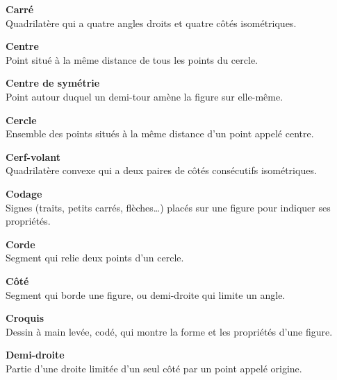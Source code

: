 \begin{tcbraster}[raster columns=2, raster equal height, raster valign=top,raster column skip=2mm, raster row skip=2mm]
\begin{terme}
\end{terme}
\begin{terme}
\textbf{\large Carré}\\[2pt]
{\small Quadrilatère qui a quatre angles droits et quatre côtés isométriques.}
\end{terme}
\begin{terme}
\textbf{\large Centre}\\[2pt]
{\small Point situé à la même distance de tous les points du cercle.}
\end{terme}
\begin{terme}
\textbf{\large Centre de symétrie}\\[2pt]
{\small Point autour duquel un demi-tour amène la figure sur elle-même.}
\end{terme}
\begin{terme}
\textbf{\large Cercle}\\[2pt]
{\small Ensemble des points situés à la même distance d'un point appelé centre.}
\end{terme}
\begin{terme}
\textbf{\large Cerf-volant}\\[2pt]
{\small Quadrilatère convexe qui a deux paires de côtés consécutifs isométriques.}
\end{terme}
\begin{terme}
\textbf{\large Codage}\\[2pt]
{\small Signes (traits, petits carrés, flèches\ldots) placés sur une figure pour indiquer ses propriétés.}
\end{terme}
\begin{terme}
\textbf{\large Corde}\\[2pt]
{\small Segment qui relie deux points d'un cercle.}
\end{terme}
\begin{terme}
\textbf{\large Côté}\\[2pt]
{\small Segment qui borde une figure, ou demi-droite qui limite un angle.}
\end{terme}
\begin{terme}
\textbf{\large Croquis}\\[2pt]
{\small Dessin à main levée, codé, qui montre la forme et les propriétés d'une figure.}
\end{terme}
\begin{terme}
\textbf{\large Demi-droite}\\[2pt]
{\small Partie d'une droite limitée d'un seul côté par un point appelé origine.}
\end{terme}

\end{tcbraster}
